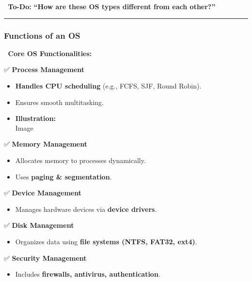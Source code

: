 \documentclass[
]{article}
\providecommand{\tightlist}{%
  \setlength{\itemsep}{0pt}\setlength{\parskip}{0pt}}
\begin{document}
📌 \textbf{To-Do:} \textbf{``How are these OS types different from each
other?''}

\begin{center}\rule{0.5\linewidth}{0.5pt}\end{center}

\subsubsection{\texorpdfstring{\textbf{Functions of an
OS}}{Functions of an OS}}\label{functions-of-an-os}

📌 \textbf{Core OS Functionalities:}

✅ \textbf{Process Management}

\begin{itemize}
\tightlist
\item
  \textbf{Handles CPU scheduling} (e.g., FCFS, SJF, Round Robin).
\item
  Ensures smooth multitasking.
\item
  \textbf{Illustration:}\\
  {Image}
\end{itemize}

✅ \textbf{Memory Management}

\begin{itemize}
\tightlist
\item
  Allocates memory to processes dynamically.
\item
  Uses \textbf{paging \& segmentation}.
\end{itemize}

✅ \textbf{Device Management}

\begin{itemize}
\tightlist
\item
  Manages hardware devices via \textbf{device drivers}.
\end{itemize}

✅ \textbf{Disk Management}

\begin{itemize}
\tightlist
\item
  Organizes data using \textbf{file systems (NTFS, FAT32, ext4)}.
\end{itemize}

✅ \textbf{Security Management}

\begin{itemize}
\tightlist
\item
  Includes \textbf{firewalls, antivirus, authentication}.
\end{itemize}
\end{document}
